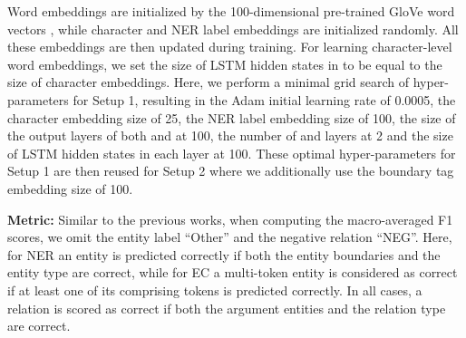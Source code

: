 \documentclass[runningheads]{llncs}
\begin{document}
 Word embeddings are initialized by the 100-dimensional pre-trained GloVe word vectors  \cite{pennington-socher-manning:2014:EMNLP2014}, while character and NER label embeddings are  initialized randomly. All these embeddings are then updated during training. 
For learning character-level word embeddings, we   set the size of LSTM hidden states  in  to be equal to the size of character embeddings.   
Here, we perform a minimal grid search of hyper-parameters for Setup 1, resulting in the Adam initial learning rate of 0.0005,  the character embedding size of 25, the NER label embedding size of 100,  the size of the output layers of both  and  at 100,  the number of  and  layers at 2 and the size of LSTM hidden states  in each layer  at 100.  These optimal hyper-parameters for Setup 1 are then reused for Setup 2 where we additionally use  the boundary tag embedding size of 100. 

\medskip

\noindent\textbf{Metric:}  Similar to the previous works, when computing the macro-averaged F1 scores, we omit the entity label ``Other'' and the negative relation  ``NEG''. Here, for NER an entity is predicted correctly if both the entity boundaries and the entity type are correct, while for EC a multi-token entity is considered as correct if at least one of its comprising tokens is predicted correctly. In all cases, a relation is scored as correct if both the argument entities and the relation type are correct. 
\end{document}
